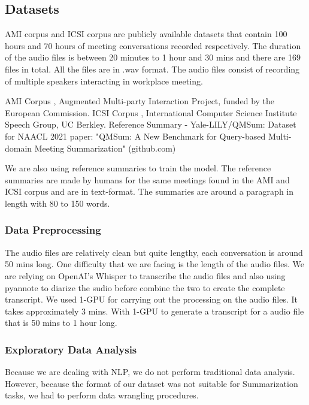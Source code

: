 

\subsection{Datasets} 
\label{sec:datasets} 

AMI corpus and ICSI corpus are publicly available datasets that contain 100 hours and 70 hours of meeting conversations recorded respectively. The duration of the audio files is between 20 minutes to 1 hour and 30 mins and there are 169 files in total. All the files are in
.wav format. The audio files consist of recording of multiple speakers interacting in workplace meeting.


AMI Corpus \cite{AMIurl, kraaij2005ami}, Augmented Multi-party Interaction Project, funded by the European Commission. 
ICSI Corpus \cite{ICSIurl, janin2003icsi}, International Computer Science Institute Speech Group, UC Berkley.
Reference Summary - Yale-LILY/QMSum: Dataset for NAACL 2021 paper: "QMSum: A New Benchmark for Query-based Multi-domain Meeting Summarization" (github.com)

We are also using reference summaries to train the model. The reference summaries are made by humans for the same meetings found in the AMI and ICSI corpus and are in text-format. The summaries are around a paragraph in length with 80 to 150 words.


\subsubsection{Data Preprocessing}

The audio files are relatively clean but quite lengthy, each conversation is around 50 mins long. One difficulty that we are facing is the length of the audio files. We are relying on OpenAI’s Whisper to transcribe the audio files and also using pyannote to diarize the sudio before combine the two to create the complete transcript. We used 1-GPU for carrying out the processing on the audio files. It takes approximately 3 mins. With 1-GPU to generate a transcript for a audio file that is 50 mins to 1 hour long.

\subsubsection{Exploratory Data Analysis}

Because we are dealing with NLP, we do not perform traditional data analysis. However, because the format of our dataset was not suitable for Summarization tasks, we had to perform data wrangling procedures.

